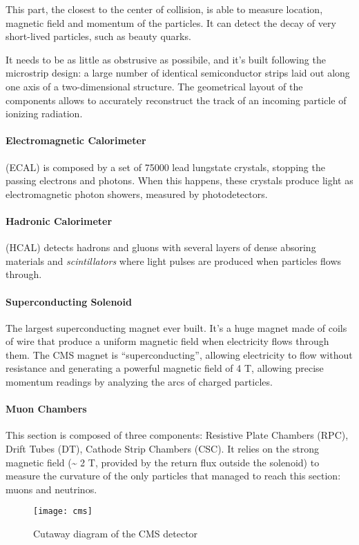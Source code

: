 This part, the closest to the center of collision, is able to measure location, magnetic field and momentum of the particles. It can detect the decay of very short-lived particles, such as beauty quarks.

It needs to be as little as obstrusive as possibile, and it's built following the microstrip design: a large number of identical semiconductor strips laid out along one axis of a two-dimensional structure. The geometrical layout of the components allows to accurately reconstruct the track of an incoming particle of ionizing radiation.

\paragraph{Electromagnetic Calorimeter} (ECAL) is composed by a set of 75000 lead lungstate crystals, stopping the passing electrons and photons. When this happens, these crystals produce light as electromagnetic photon showers, measured by photodetectors.


\paragraph{Hadronic Calorimeter} (HCAL) detects hadrons and gluons with several layers of dense absoring materials and \textit{scintillators} where light pulses are produced when particles flows through.

\paragraph{Superconducting Solenoid} The largest superconducting magnet ever built. It's a huge magnet made of coils of wire that produce a uniform magnetic field when electricity flows through them. The CMS magnet is “superconducting”, allowing electricity to flow without resistance and generating a powerful magnetic field of 4 T, allowing precise momentum readings by analyzing the arcs of charged particles.

\paragraph{Muon Chambers}

This section is composed of three components: Resistive Plate Chambers (RPC), Drift Tubes (DT), Cathode Strip Chambers (CSC). It relies on the strong magnetic field (\~{} 2 T, provided by the return flux outside the solenoid) to measure the curvature of the only particles that managed to reach this section: muons and neutrinos.


\begin{figure}
	\centerline{
		\texttt{[image: cms]}}
	\caption{Cutaway diagram of the CMS detector \cite{Sakuma_2014}}
	\label{fig:cms}
\end{figure}